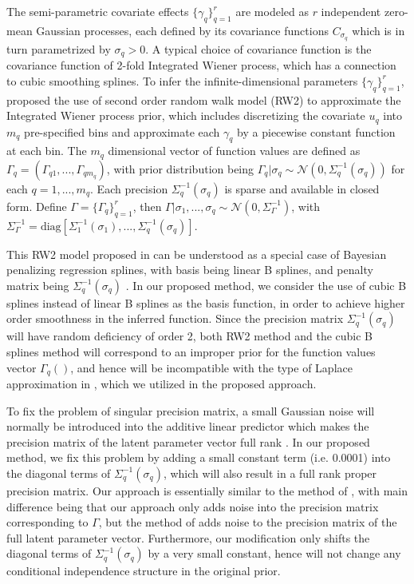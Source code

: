 \documentclass[ba]{imsart}
\begin{document}
The semi-parametric covariate effects $\{\gamma_q\}_{q=1}^{r}$ are modeled as $r$ independent zero-mean Gaussian processes, each defined by its covariance functions $C_{\sigma_{q}}$ which is in turn parametrized by $\sigma_q > 0$. A typical choice of covariance function is the covariance function of 2-fold Integrated Wiener process\citep{wiener}, which has a connection to cubic smoothing splines\citep{wahbaprior}.
To infer the infinite-dimensional parameters $\{\gamma_q\}_{q=1}^{r}$, \cite{rw2} proposed the use of second order random walk model (RW2) to approximate the Integrated Wiener process prior, which includes discretizing the covariate $u_q$ into $m_q$ pre-specified bins and approximate each $\gamma_q$ by a piecewise constant function at each bin. The $m_q$ dimensional vector of function values are defined as $\Gamma_q = (\Gamma_{q1}, ..., \Gamma_{qm_q})$, with prior distribution being $\Gamma_q|\sigma_q \sim \mathcal{N}(0,\Sigma_q^{-1}(\sigma_q))$ for each $q = 1,...,m_q$. Each precision $\Sigma_q^{-1}(\sigma_q)$ is sparse and available in closed form. Define $\Gamma = \{\Gamma_q\}_{q=1}^{r}$, then $\Gamma|\sigma_1,...,\sigma_q \sim \mathcal{N}(0,\Sigma_\Gamma^{-1})$, with $\Sigma_\Gamma^{-1} = \text{diag}[\Sigma_1^{-1}(\sigma_1), ..., \Sigma_q^{-1}(\sigma_q)]$.

This RW2 model proposed in \cite{rw2} can be understood as a special case of Bayesian penalizing regression splines, with basis being linear B splines, and penalty matrix being $\Sigma_q^{-1}(\sigma_q)$ \citep{SPDEandPspline}. In our proposed method, we consider the use of cubic B splines instead of linear B splines as the basis function, in order to achieve higher order smoothness in the inferred function. Since the precision matrix $\Sigma_q^{-1}(\sigma_q)$ will have random deficiency of order 2, both RW2 method and the cubic B splines method will correspond to an improper prior for the function values vector $\Gamma_q()$, and hence will be incompatible with the type of Laplace approximation in \cite{tierney}, which we utilized in the proposed approach. 

To fix the problem of singular precision matrix, a small Gaussian noise will normally be introduced into the additive linear predictor which makes the precision matrix of the latent parameter vector full rank \citep{casecross,inla}. In our proposed method, we fix this problem by adding a small constant term (i.e. 0.0001) into the diagonal terms of $\Sigma_q^{-1}(\sigma_q)$, which will also result in a full rank proper precision matrix. Our approach is essentially similar to the method of \cite{casecross,inla}, with main difference being that our approach only adds noise into the precision matrix corresponding to $\Gamma$, but the method of \cite{casecross,inla} adds noise to the precision matrix of the full latent parameter vector. Furthermore, our modification only shifts the diagonal terms of $\Sigma_q^{-1}(\sigma_q)$ by a very small constant, hence will not change any conditional independence structure in the original prior.
\end{document}
